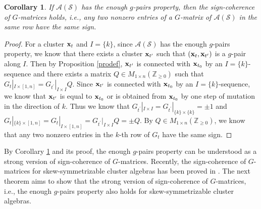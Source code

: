 \documentclass[14pt]{amsart}
\newtheorem{Corollary}[Theorem]{Corollary}
\begin{document}
\begin{Corollary}\label{corsign}
If $\mathcal A(\mathcal S)$ has the enough $g$-pairs property, then the sign-coherence of $G$-matrices holds, i.e., any two nonzero entries of a $G$-matrix of $\mathcal A(\mathcal S)$ in the same row have the same sign.
\end{Corollary}
\begin{proof}
For a cluster ${\bf x}_t$ and $I=\{k\}$, since $\mathcal A(\mathcal S)$ has the enough $g$-pairs property, we know that there exists a cluster ${\bf x}_{t^{\prime}}$ such that $({\bf x}_t,{\bf x}_{t^{\prime}})$ is a $g$-pair along $I$. Then by Proposition \ref{prodef}, ${\bf x}_{t^{\prime}}$ is connected with ${\bf x}_{t_0}$ by an $I=\{k\}$-sequence and
there exists a matrix $Q\in M_{1 \times n}(\mathbb Z_{\geq 0})$ such that
$G_t|_{I\times [1,n]}=G_{t^\prime}|_{I\times I}Q$. Since  ${\bf x}_{t^{\prime}}$ is connected with ${\bf x}_{t_0}$ by an $I=\{k\}$-sequence, we know that  ${\bf x}_{t^{\prime}}$ is equal to ${\bf x}_{t_0}$ or is obtained from  ${\bf x}_{t_0}$ by one step of mutation in the direction of $k$. Thus we know that $G_{t^\prime}|_{I\times I}=G_{t^\prime}|_{\{k\}\times \{k\}}=\pm 1$ and $G_t|_{\{k\}\times [1,n]}=G_t|_{I\times [1,n]}=G_{t^\prime}|_{I\times I}Q=\pm Q$. By $Q\in M_{1 \times n}(\mathbb Z_{\geq 0})$, we know that any two nonzero entries in the $k$-th row of $G_t$ have the same sign.
\end{proof}

By Corollary \ref{corsign} and its proof, the  enough $g$-pairs property can be understood as a strong version of sign-coherence of $G$-matrices. Recently, the sign-coherence of $G$-matrices for skew-symmetrizable cluster algebras has been proved in \cite{GHKK}. The next theorem aims to show that the  strong version of sign-coherence of $G$-matrices, i.e., the enough $g$-pairs property also holds for skew-symmetrizable cluster algebras.
\end{document}
